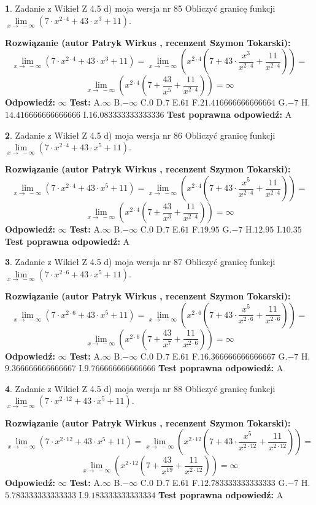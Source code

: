 \documentclass[12pt, a4paper]{article}
\theoremstyle{definition} %
\newtheorem{zad}{}
\newcommand{\zadStart}[1]{\begin{zad}#1\newline}
\newcommand{\zadStop}{\end{zad}}
\newcommand{\rozwStart}[2]{\noindent \textbf{Rozwiązanie (autor #1 , recenzent #2): }\newline}
\newcommand{\rozwStop}{\newline}
\newcommand{\odpStart}{\noindent \textbf{Odpowiedź:}\newline}
\newcommand{\odpStop}{\newline}
\newcommand{\testStart}{\noindent \textbf{Test:}\newline}
\newcommand{\testStop}{\newline}
\newcommand{\kluczStart}{\noindent \textbf{Test poprawna odpowiedź:}\newline}
\newcommand{\kluczStop}{\newline}
\begin{document}
\zadStart{Zadanie z Wikieł Z 4.5 d) moja wersja nr 85}
Obliczyć granicę funkcji  $\lim\limits_{x\to\ -\infty}(7 \cdot x^{2\cdot4}+43 \cdot x^{3}+11)$.
\zadStop
\rozwStart{Patryk Wirkus}{Szymon Tokarski}
$$\lim\limits_{x\to\ -\infty}(7 \cdot x^{2\cdot4}+43 \cdot x^{3}+11) = \lim\limits_{x\to\ -\infty}(x^{2\cdot4}(7 +43 \cdot \frac{x^{3}}{x^{2\cdot4}}+\frac{11}{x^{2\cdot4}})) =$$ $$\lim\limits_{x\to\ -\infty}(x^{2\cdot4}(7 +\frac{43}{x^{5}}+\frac{11}{x^{2\cdot4}})) =\infty$$
\rozwStop
\odpStart
$\infty$
\odpStop
\testStart
A.$\infty$ B.$-\infty$ C.$0$ D.$7$ E.$61$
F.$21.416666666666664$ G.$-7$
H.$14.416666666666666$
I.$16.083333333333336$
\testStop
\kluczStart
A
\kluczStop



\zadStart{Zadanie z Wikieł Z 4.5 d) moja wersja nr 86}
Obliczyć granicę funkcji  $\lim\limits_{x\to\ -\infty}(7 \cdot x^{2\cdot4}+43 \cdot x^{5}+11)$.
\zadStop
\rozwStart{Patryk Wirkus}{Szymon Tokarski}
$$\lim\limits_{x\to\ -\infty}(7 \cdot x^{2\cdot4}+43 \cdot x^{5}+11) = \lim\limits_{x\to\ -\infty}(x^{2\cdot4}(7 +43 \cdot \frac{x^{5}}{x^{2\cdot4}}+\frac{11}{x^{2\cdot4}})) =$$ $$\lim\limits_{x\to\ -\infty}(x^{2\cdot4}(7 +\frac{43}{x^{3}}+\frac{11}{x^{2\cdot4}})) =\infty$$
\rozwStop
\odpStart
$\infty$
\odpStop
\testStart
A.$\infty$ B.$-\infty$ C.$0$ D.$7$ E.$61$
F.$19.95$ G.$-7$
H.$12.95$
I.$10.35$
\testStop
\kluczStart
A
\kluczStop



\zadStart{Zadanie z Wikieł Z 4.5 d) moja wersja nr 87}
Obliczyć granicę funkcji  $\lim\limits_{x\to\ -\infty}(7 \cdot x^{2\cdot6}+43 \cdot x^{5}+11)$.
\zadStop
\rozwStart{Patryk Wirkus}{Szymon Tokarski}
$$\lim\limits_{x\to\ -\infty}(7 \cdot x^{2\cdot6}+43 \cdot x^{5}+11) = \lim\limits_{x\to\ -\infty}(x^{2\cdot6}(7 +43 \cdot \frac{x^{5}}{x^{2\cdot6}}+\frac{11}{x^{2\cdot6}})) =$$ $$\lim\limits_{x\to\ -\infty}(x^{2\cdot6}(7 +\frac{43}{x^{7}}+\frac{11}{x^{2\cdot6}})) =\infty$$
\rozwStop
\odpStart
$\infty$
\odpStop
\testStart
A.$\infty$ B.$-\infty$ C.$0$ D.$7$ E.$61$
F.$16.366666666666667$ G.$-7$
H.$9.366666666666667$
I.$9.766666666666666$
\testStop
\kluczStart
A
\kluczStop



\zadStart{Zadanie z Wikieł Z 4.5 d) moja wersja nr 88}
Obliczyć granicę funkcji  $\lim\limits_{x\to\ -\infty}(7 \cdot x^{2\cdot12}+43 \cdot x^{5}+11)$.
\zadStop
\rozwStart{Patryk Wirkus}{Szymon Tokarski}
$$\lim\limits_{x\to\ -\infty}(7 \cdot x^{2\cdot12}+43 \cdot x^{5}+11) = \lim\limits_{x\to\ -\infty}(x^{2\cdot12}(7 +43 \cdot \frac{x^{5}}{x^{2\cdot12}}+\frac{11}{x^{2\cdot12}})) =$$ $$\lim\limits_{x\to\ -\infty}(x^{2\cdot12}(7 +\frac{43}{x^{19}}+\frac{11}{x^{2\cdot12}})) =\infty$$
\rozwStop
\odpStart
$\infty$
\odpStop
\testStart
A.$\infty$ B.$-\infty$ C.$0$ D.$7$ E.$61$
F.$12.783333333333333$ G.$-7$
H.$5.783333333333333$
I.$9.183333333333334$
\testStop
\kluczStart
A
\kluczStop
\end{document}
